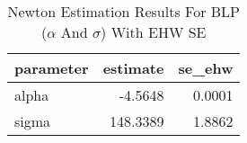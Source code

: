 \begin{table}[htbp]
    \centering
    \caption{Newton Estimation Results For BLP ($\alpha$ And $\sigma$) With EHW SE}
    \label{tab:blp_q8_newton_results}
\begin{tabular}{lrr}
\toprule
parameter & estimate & se\_ehw \\
\midrule
\midrule
alpha & -4.5648 & 0.0001 \\
sigma & 148.3389 & 1.8862 \\
\bottomrule
\bottomrule
\end{tabular}

\end{table}
